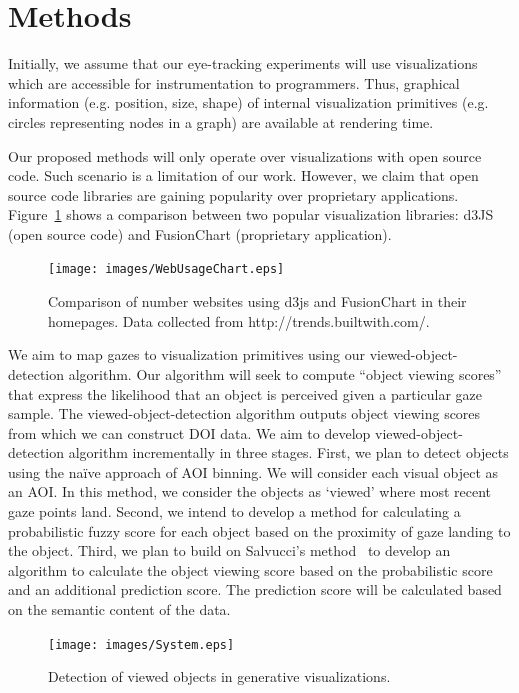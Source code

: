 \section{Methods}
\label{sec:DOICollectionMethods}
Initially, we assume that our eye-tracking experiments will use visualizations which are accessible for instrumentation to programmers. Thus, graphical information (e.g. position, size, shape) of internal visualization primitives (e.g. circles representing nodes in a graph) are available at rendering time. 

Our proposed methods will only operate over visualizations with open source code. Such scenario is a limitation of our work. However, we claim that open source code libraries are gaining popularity over proprietary applications. Figure~\ref{fig:WebUsageChart} shows a comparison between two popular visualization libraries: d3JS (open source code) and FusionChart (proprietary application).

\begin{figure}[htb]
  \centering
  \texttt{[image: images/WebUsageChart.eps]}
  \caption{Comparison of number websites using d3js and FusionChart in their homepages. Data collected from http://trends.builtwith.com/. }
	\label{fig:WebUsageChart}
\end{figure}

We aim to map gazes to visualization primitives using our viewed-object-detection algorithm. Our algorithm will seek to compute ``object viewing scores'' that express the likelihood that an object is perceived given a particular gaze sample. The viewed-object-detection algorithm outputs object viewing scores from which we can construct DOI data. We aim to develop viewed-object-detection algorithm incrementally in three stages. First, we plan to detect objects using the na\"{i}ve approach of AOI binning. We will consider each visual object as an AOI. In this method, we consider the objects as `viewed' where most recent gaze points land. Second, we intend to develop a method for calculating a probabilistic fuzzy score for each object based on the proximity of gaze landing to the object. Third, we plan to build on Salvucci's method~\cite{Sal00} to develop an algorithm to calculate the object viewing score based on the probabilistic score and an additional prediction score. The prediction score will be calculated based on the semantic content of the data. 

\begin{figure}[htb]
  \centering
  \texttt{[image: images/System.eps]}
  \caption{Detection of viewed objects in generative visualizations.}
	\label{fig:System}
\end{figure}

